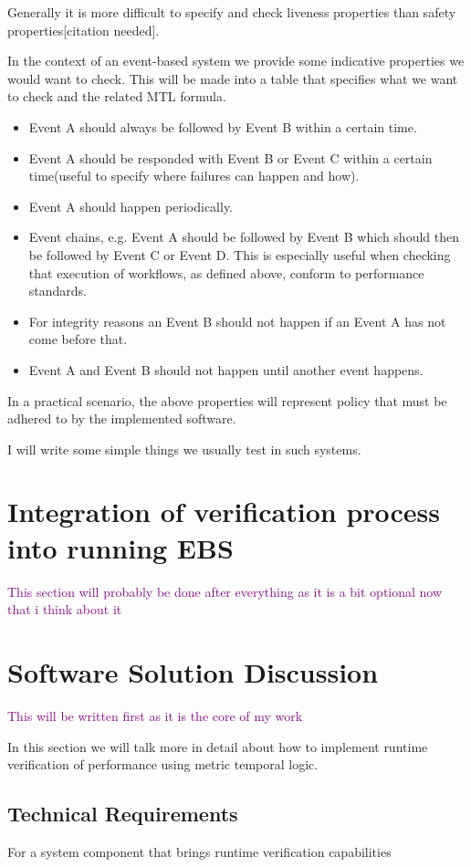 \documentclass{article}
\newcommand{\note}[1] {
	\textcolor{Purple}{#1}

}
\begin{document}
Generally it is more difficult to specify and check liveness properties than safety properties[citation needed].


In the context of an event-based system we provide some indicative properties we would want to check. This will be made into a table that specifies what we want to check and the related MTL formula.
\begin{itemize}
	\item Event A should always be followed by Event B within a certain time.
	\item Event A should be responded with Event B or Event C within a certain time(useful to specify where failures can happen and how).
	\item Event A should happen periodically.
	\item Event chains, e.g. Event A should be followed by Event B which should then be followed by Event C or Event D. This is especially useful when checking that execution of workflows, as defined above, conform to performance standards.
	\item For integrity reasons an Event B should not happen if an Event A has not come before that.
	\item Event A and Event B should not happen until another event happens.
\end{itemize}
In a practical scenario, the above properties will represent policy that must be adhered to by the implemented software.

I will write some simple things we usually test in such systems.

\section{Integration of verification process into running EBS}
\note{This section will probably be done after everything as it is a bit optional now that i think about it}
\section{Software Solution Discussion}
\note{This will be written first as it is the core of my work}
In this section we will talk more in detail about how to implement runtime verification of performance using metric temporal logic.
\subsection{Technical Requirements}
For a system component that brings runtime verification capabilities
\end{document}
